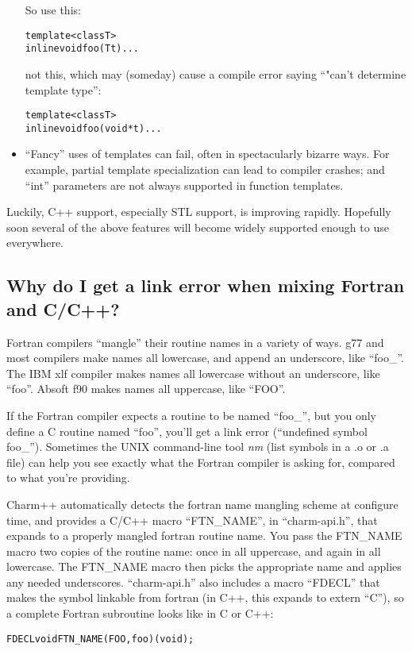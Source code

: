 \begin{itemize}
So use this:
\begin{alltt}
template <class T>
inline void foo(T t) {...}
\end{alltt}
not this, which may (someday) cause a compile error saying 
``"can't determine template type'':
\begin{alltt}
template <class T>
inline void foo(void *t) {...}
\end{alltt}

\item ``Fancy'' uses of templates can fail, often in spectacularly
bizarre ways.  For example, partial template specialization can 
lead to compiler crashes; and ``int'' parameters are not always 
supported in function templates. 

\end{itemize}

Luckily, C++ support, especially STL support, is improving
rapidly.  Hopefully soon several of the above features will
become widely supported enough to use everywhere.

\subsection{Why do I get a link error when mixing Fortran and C/C++?}

\label{f2c}

Fortran compilers ``mangle'' their routine names in a variety
of ways.  g77 and most compilers make names all lowercase, and 
append an underscore, like ``foo\_''.  The IBM xlf compiler makes 
names all lowercase without an underscore, like ``foo''. Absoft f90 
makes names all uppercase, like ``FOO''. 

If the Fortran compiler expects a routine to be named ``foo\_'',
but you only define a C routine named ``foo'', you'll get a link 
error (``undefined symbol foo\_'').  Sometimes the UNIX command-line
tool {\em nm} (list symbols in a .o or .a file) can help you see exactly what the 
Fortran compiler is asking for, compared to what you're providing.

Charm++ automatically detects the fortran name mangling scheme
at configure time, and provides a C/C++ macro ``FTN\_NAME'', in ``charm-api.h'',
that expands to a properly mangled fortran routine name.
You pass the FTN\_NAME macro
two copies of the routine name: once in all uppercase, and again 
in all lowercase.
The FTN\_NAME macro then picks the appropriate name and applies any
needed underscores.  ``charm-api.h'' also includes a macro ``FDECL''
that makes the symbol linkable from fortran (in C++, this expands
to extern ``C''), so a complete Fortran subroutine looks like in C or C++:
\begin{alltt}
FDECL void FTN\_NAME(FOO,foo)(void);
\end{alltt}

